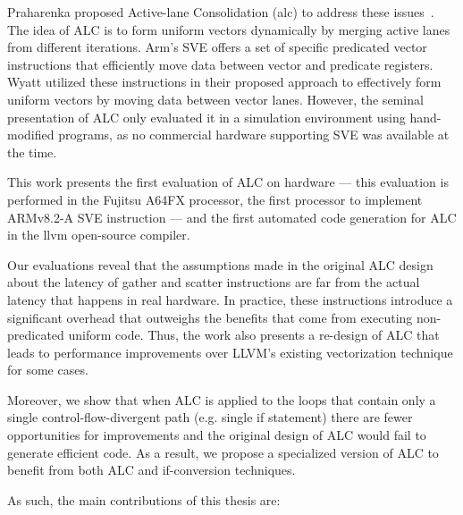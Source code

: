 Praharenka \etal proposed Active-lane Consolidation (\acrshort{alc}) to address these issues~\cite{praharenka_vectorizing_2022}.
The idea of ALC is to form uniform vectors dynamically by merging active lanes from different iterations. 
Arm's SVE offers a set of specific predicated vector instructions that efficiently move data between vector and predicate registers. Wyatt \etal utilized these instructions in their proposed approach to effectively form uniform vectors by moving data between vector lanes. 
However, the seminal presentation of ALC only evaluated it in a simulation environment using hand-modified programs, as no commercial hardware supporting SVE was available at the time.

This work presents the first evaluation of ALC on hardware --- this evaluation is performed in the Fujitsu A64FX processor, the first processor to implement ARMv8.2-A SVE instruction --- and the first automated code generation for ALC in the  \acrshort{llvm} open-source compiler.

Our evaluations reveal that the assumptions made in the original ALC design about the latency of gather and scatter instructions are far from the actual latency that happens in real hardware. In practice, these instructions introduce a significant overhead that outweighs the benefits that come from  executing non-predicated uniform code.
Thus, the work also presents a re-design of ALC that leads to performance improvements over LLVM's existing vectorization technique for some cases.

Moreover, we show that when ALC is applied to the loops that contain only a single control-flow-divergent path (e.g. single if statement) there are fewer opportunities for improvements and the original design of ALC would fail to generate efficient code. As a result, we propose a specialized version of ALC to benefit from both ALC and if-conversion techniques.


As such, the main contributions of this thesis are:

